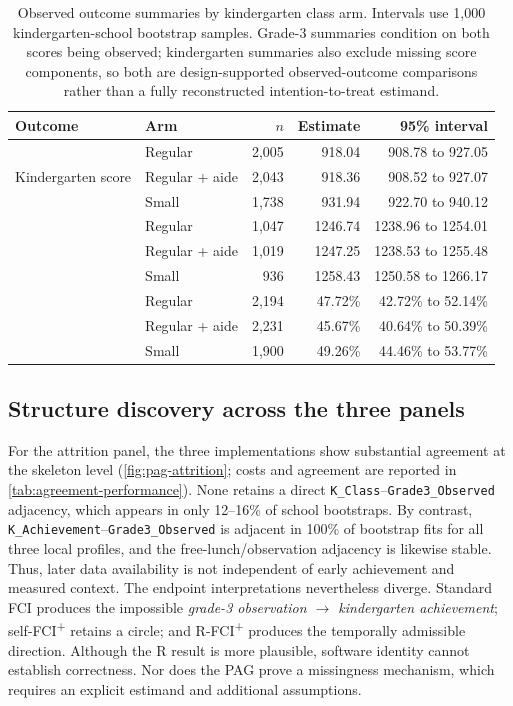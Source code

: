 \documentclass[11pt,a4paper]{article}
\theoremstyle{definition}
\newcommand{\FCIplus}{FCI\textsuperscript{+}}
\newcommand{\code}[1]{\texttt{#1}}
\begin{document}
\begin{table}[!t]
\caption{Observed outcome summaries by kindergarten class arm. Intervals use
1,000 kindergarten-school bootstrap samples. Grade-3 summaries condition on
both scores being observed; kindergarten summaries also exclude missing
score components, so both are design-supported observed-outcome comparisons
rather than a fully reconstructed intention-to-treat estimand.}
\label{tab:arm-summary}
\centering
\begin{tabular}{llrrr}
\toprule
Outcome & Arm & \(n\) & Estimate & 95\% interval \\
\midrule
\multirow{3}{*}{Kindergarten score}
 & Regular & 2,005 & 918.04 & 908.78 to 927.05 \\
 & Regular + aide & 2,043 & 918.36 & 908.52 to 927.07 \\
 & Small & 1,738 & 931.94 & 922.70 to 940.12 \\
\addlinespace
\multirow{3}{*}{Grade-3 score}
 & Regular & 1,047 & 1246.74 & 1238.96 to 1254.01 \\
 & Regular + aide & 1,019 & 1247.25 & 1238.53 to 1255.48 \\
 & Small & 936 & 1258.43 & 1250.58 to 1266.17 \\
\addlinespace
\multirow{3}{*}{Grade-3 observed}
 & Regular & 2,194 & 47.72\% & 42.72\% to 52.14\% \\
 & Regular + aide & 2,231 & 45.67\% & 40.64\% to 50.39\% \\
 & Small & 1,900 & 49.26\% & 44.46\% to 53.77\% \\
\bottomrule
\end{tabular}
\end{table}

\subsection{Structure discovery across the three panels}

For the attrition panel, the three implementations show substantial agreement
at the skeleton level (\cref{fig:pag-attrition}; costs and agreement are
reported in \cref{tab:agreement-performance}). None retains a direct
\code{K\_Class}--\code{Grade3\_Observed} adjacency, which appears in only
12--16\% of school bootstraps. By contrast,
\code{K\_Achievement}--\code{Grade3\_Observed} is adjacent in 100\% of
bootstrap fits for all three local profiles, and the free-lunch/observation
adjacency is likewise stable. Thus, later data availability is not
independent of early achievement and measured context. The endpoint
interpretations nevertheless diverge. Standard FCI produces the impossible
\emph{grade-3 observation \(\rightarrow\) kindergarten achievement};
self-\FCIplus{} retains a circle; and R-\FCIplus{} produces the temporally
admissible direction. Although the R result is more plausible, software
identity cannot establish correctness. Nor does the PAG prove a missingness
mechanism, which requires an explicit estimand and additional assumptions.
\end{document}
